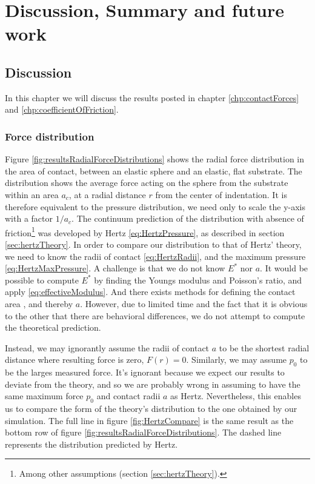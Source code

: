 \documentclass[twoside,english]{uiofysmaster}
\begin{document}
\part{Discussion, Summary and future work}

\chapter{Discussion}\label{chap:discussion}
In this chapter we will discuss the results posted in chapter \ref{chp:contactForces} and \ref{chp:coefficientOfFriction}. 

\section{Force distribution}
Figure \ref{fig:resultsRadialForceDistributions} shows the radial force distribution in the area of contact, between an elastic sphere and an elastic, flat substrate. 
The distribution shows the average force acting on the sphere from the substrate within an area $a_c$, at a radial distance $r$ from the center of indentation.
It is therefore equivalent to the pressure distribution, we need only to scale the y-axis with a factor $1/a_c$.  
The continuum prediction of the distribution with absence of friction\footnote{Among other assumptions (section \ref{sec:hertzTheory}).} was developed by Hertz \eqref{eq:HertzPressure}, as described in section \ref{sec:hertzTheory}. 
In order to compare our distribution to that of Hertz' theory, we need to know the radii of contact \eqref{eq:HertzRadii}, and the maximum pressure \eqref{eq:HertzMaxPressure}.
A challenge is that we do not know $E^*$ nor $a$.
It would be possible to compute $E^*$ by finding the Youngs modulus and Poisson's ratio, and apply \eqref{eq:effectiveModulus}. And there exists methods for defining the contact area \cite{RobbinsDefiningContactAtTheAtomicScale}, and thereby $a$.  
However, due to limited time and the fact that it is obvious to the other that there are behavioral differences, we do not attempt to compute the theoretical prediction.

Instead, we may ignorantly assume the radii of contact $a$ to be the shortest radial distance where resulting force is zero, $F(r)=0$. Similarly, we may assume $p_0$ to be the larges measured force.
It's ignorant because we expect our results to deviate from the theory, and so we are probably wrong in assuming  %
to have the same maximum force $p_0$ and contact radii $a$ as Hertz.
Nevertheless, this enables us to compare the form of the theory's distribution to the one obtained by our simulation. 
The full line in figure \ref{fig:HertzCompare} is the same result as the bottom row of figure \ref{fig:resultsRadialForceDistributions}.
The dashed line represents the distribution predicted by Hertz.
\end{document}
